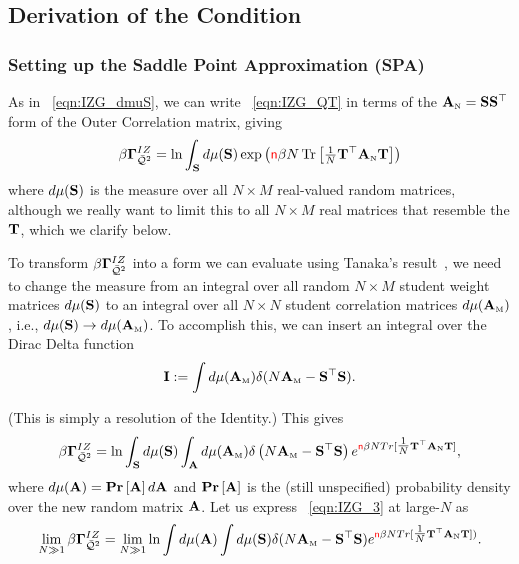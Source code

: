 \subsection{Derivation of the \TRACELOG Condition}
\label{sxn:TraceLogDerivation}


\subsubsection{Setting up the Saddle Point Approximation (SPA)}
\label{sxn:TraceLogDerivation_A}
As in \EQN~\ref{eqn:IZG_dmuS}, 
we can write \EQN~\ref{eqn:IZG_QT} in terms of the ${\mathbf{A}}_{\text{\tiny N}} = {\mathbf{S}}{\mathbf{S}}^{\top}$ form of the Outer \Student Correlation matrix, giving
\begin{align}
\beta\mathbf{\Gamma}^{IZ}_{\bar{\mathcal{Q}}^{2}} = \ln\int_{{\mathbf{S}}} d\mu({\mathbf{S}}) \exp\left({\color{red}\sf{n}}\beta N \mbox{}\operatorname{Tr}\left[ \tfrac{1}{N}{\mathbf{T}}^{\top}{\mathbf{A}}_{\text{\tiny N}} {\mathbf{T}} \right] \right)
\end{align}
where $d\mu({\mathbf{S}})$ is the measure over all $N \times M$ real-valued random matrices,
although we really want to limit this to all $N \times M$ real matrices that resemble the \Teacher ${\mathbf{T}}$,
which we clarify below.

To transform $\beta\mathbf{\Gamma}^{IZ}_{\bar{\mathcal{Q}}^{2}}$ into a form we can evaluate using Tanaka's result~\cite{Tanaka2008}, 
we need to change the measure from an integral over all random $N \times M$ student weight matrices
$d\mu({\mathbf{S}})$ to an integral over all $N \times N$
student correlation matrices $d\mu({\mathbf{A}}_{\text{\tiny M}})$, i.e., $d\mu({\mathbf{S}})\rightarrow d\mu({\mathbf{A}}_{\text{\tiny M}})$.
To accomplish this, we can insert an integral over the Dirac Delta function
\begin{align}
  \label{eqn:I}
  \mathbf{I}:=
  \int d\mu({\mathbf{A}}_{\text{\tiny M}})\delta(N{\mathbf{A}}_{\text{\tiny M}}-{\mathbf{S}}^{\top}{\mathbf{S}}).
\end{align}

\noindent
(This is simply a resolution of the Identity.) This gives
\begin{align}
\label{eqn:IZG_3}
\beta\mathbf{\Gamma}^{IZ}_{\bar{\mathcal{Q}}^{2}}= \ln \int_{{\mathbf{S}}} d\mu({\mathbf{S}})\int_{\mathbf{A}} d\mu({\mathbf{A}}_{\text{\tiny M}})
           \delta\left( N{\mathbf{A}}_{\text{\tiny M}}-{\mathbf{S}}^{\top}{\mathbf{S}} \right) 
           e^{ {\color{red}\sf{n}}\beta N Tr[\tfrac{1}{N} {\mathbf{T}}^{\top} {\mathbf{A}}_{\text{\tiny N}}{\mathbf{T}} ] } ,
\end{align}
 where $d\mu(\mathbf{A})=\mbox{}{\bf{Pr}}\left[\mathbf{A}\right]d\mathbf{A}$ and $\mbox{}{\bf{Pr}}\left[\mathbf{A}\right]$ is the
(still unspecified) probability density over the new random matrix $\mathbf{A}$. 
%
Let us express \EQN~\ref{eqn:IZG_3} at large-$N$ as
\begin{align}
  \label{eqn:IZG_4}
  \lim_{N\gg 1}\beta\mathbf{\Gamma}^{IZ}_{\bar{\mathcal{Q}}^{2}} =
  \lim_{N\gg 1}\ln
  \int d\mu(\mathbf{A})
  \int d\mu({\mathbf{S}})
  \delta(N{\mathbf{A}}_{\text{\tiny M}}-{\mathbf{S}}^{\top}{\mathbf{S}})
  e^{ {\color{red}\sf{n}}\beta N Tr[ \tfrac{1}{N}{\mathbf{T}}^{\top}{\mathbf{A}}_{\text{\tiny N}}{\mathbf{T}}]) }  .
\end{align}
 
